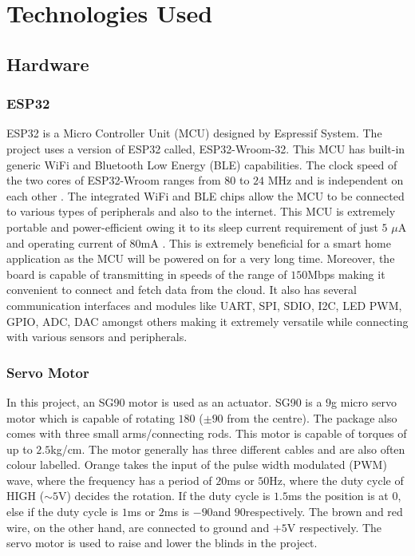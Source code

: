 \documentclass[conference]{IEEEtran}
\begin{document}
\section{Technologies Used}

\subsection{Hardware}

\subsubsection{ESP32}

ESP32 is a Micro Controller Unit (MCU) designed by Espressif System. The project uses a version of ESP32 called, ESP32-Wroom-32. This MCU has built-in generic WiFi and Bluetooth Low Energy (BLE) capabilities. The clock speed of the two cores of ESP32-Wroom ranges from $80$ to $24$ MHz and is independent on each other \cite{esp32_doc}. The integrated WiFi and BLE chips allow the MCU to be connected to various types of peripherals and also to the internet. This MCU is extremely portable and power-efficient owing it to its sleep current requirement of just $5$ $\mu$A and operating current of $80$mA \cite{esp32_doc}. This is extremely beneficial for a smart home application as the MCU will be powered on for a very long time. Moreover, the board is capable of transmitting in speeds of the range of $150$Mbps \cite{esp32_doc} making it convenient to connect and fetch data from the cloud. It also has several communication interfaces and modules like UART, SPI, SDIO, I2C, LED PWM, GPIO, ADC, DAC \cite{esp32_doc} amongst others making it extremely versatile while connecting with various sensors and peripherals. 

\subsubsection{Servo Motor}

In this project, an SG90 motor is used as an actuator. SG90 is a $9$g micro servo motor which is capable of rotating $180${\textdegree} ({$\pm$}$90${\textdegree} from the centre). The package also comes with three small arms/connecting rods. This motor is capable of torques of up to $2.5$kg/cm. The motor generally has three different cables and are also often colour labelled. Orange takes the input of the pulse width modulated (PWM) wave, where the frequency has a period of $20$ms or $50$Hz, where the duty cycle of HIGH ({$\sim$}$5$V) decides the rotation. If the duty cycle is $1.5$ms the position is at 0{\textdegree}, else if the duty cycle is $1$ms or $2$ms is $-90$\textdegree and $90$\textdegree respectively. The brown and red wire, on the other hand, are connected to ground and $+5$V respectively. The servo motor is used to raise and lower the blinds in the project.
\end{document}
